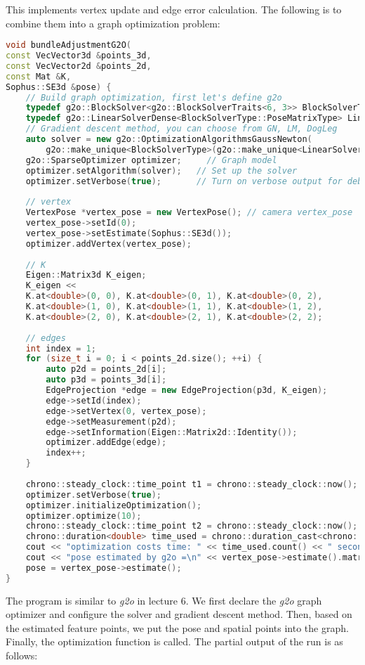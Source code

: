 This implements vertex update and edge error calculation. The following is to combine them into a graph optimization problem:
\begin{lstlisting}[language=c++,caption=slambook2/ch7/pose_estimation_3d2d.cpp (part)]
void bundleAdjustmentG2O(
const VecVector3d &points_3d,
const VecVector2d &points_2d,
const Mat &K,
Sophus::SE3d &pose) {
	// Build graph optimization, first let's define g2o
	typedef g2o::BlockSolver<g2o::BlockSolverTraits<6, 3>> BlockSolverType;  // pose is 6, landmark is 3
	typedef g2o::LinearSolverDense<BlockSolverType::PoseMatrixType> LinearSolverType;
	// Gradient descent method, you can choose from GN, LM, DogLeg
	auto solver = new g2o::OptimizationAlgorithmsGaussNewton(
		g2o::make_unique<BlockSolverType>(g2o::make_unique<LinearSolverType>()));
	g2o::SparseOptimizer optimizer;     // Graph model
	optimizer.setAlgorithm(solver);   // Set up the solver
	optimizer.setVerbose(true);       // Turn on verbose output for debugging
	
	// vertex
	VertexPose *vertex_pose = new VertexPose(); // camera vertex_pose
	vertex_pose->setId(0);
	vertex_pose->setEstimate(Sophus::SE3d());
	optimizer.addVertex(vertex_pose);
	
	// K
	Eigen::Matrix3d K_eigen;
	K_eigen <<
	K.at<double>(0, 0), K.at<double>(0, 1), K.at<double>(0, 2),
	K.at<double>(1, 0), K.at<double>(1, 1), K.at<double>(1, 2),
	K.at<double>(2, 0), K.at<double>(2, 1), K.at<double>(2, 2);
	
	// edges
	int index = 1;
	for (size_t i = 0; i < points_2d.size(); ++i) {
		auto p2d = points_2d[i];
		auto p3d = points_3d[i];
		EdgeProjection *edge = new EdgeProjection(p3d, K_eigen);
		edge->setId(index);
		edge->setVertex(0, vertex_pose);
		edge->setMeasurement(p2d);
		edge->setInformation(Eigen::Matrix2d::Identity());
		optimizer.addEdge(edge);
		index++;
	}
	
	chrono::steady_clock::time_point t1 = chrono::steady_clock::now();
	optimizer.setVerbose(true);
	optimizer.initializeOptimization();
	optimizer.optimize(10);
	chrono::steady_clock::time_point t2 = chrono::steady_clock::now();
	chrono::duration<double> time_used = chrono::duration_cast<chrono::duration<double>>(t2 - t1);
	cout << "optimization costs time: " << time_used.count() << " seconds." << endl;
	cout << "pose estimated by g2o =\n" << vertex_pose->estimate().matrix() << endl;
	pose = vertex_pose->estimate();
}
\end{lstlisting}

The program is similar to \textit{g2o} in lecture 6. We first declare the \textit{g2o} graph optimizer and configure the solver and gradient descent method. Then, based on the estimated feature points, we put the pose and spatial points into the graph. Finally, the optimization function is called. The partial output of the run is as follows:

